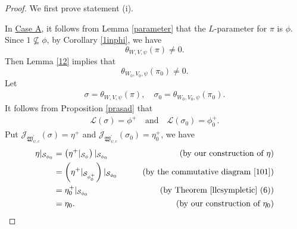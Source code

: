 \documentclass[article]{article}
\numberwithin{equation}{section}
\theoremstyle{definition}
\begin{document}
\begin{proof}
We first prove statement (i). 

In \underline{Case A}, it follows from Lemma \ref{parameter} that the $L$-parameter for $\pi$ is $\phi$. Since $\mathrm 1\not \subseteq \phi$, by Corollary \ref{1inphi}, we have $$\theta_{W,V,\psi}(\pi)\neq 0.$$ 
Then Lemma \ref{12} implies that  $$\theta_{W_0,V_0,\psi}(\pi_0)\neq 0.$$ 
Let  
\begin{align*}
\sigma=\theta_{W,V,\psi}(\pi), \quad \sigma_0=\theta_{W_0,V_0,\psi}(\pi_0). 
\end{align*}
It follows from Proposition \ref{prasad} that 
\begin{align*}
\mathcal L(\sigma)=\phi^+\quad \mbox{and}\quad \mathcal L(\sigma_0)=\phi_{0}^+. 
\end{align*}
Put $\mathcal J_{\mathfrak W^\prime_{\psi,c}}(\sigma)=\eta^+$ and $\mathcal J_{\mathfrak W^\prime_{\psi,c}}(\sigma_0)=\eta^+_0$, we have  
	\begin{align*}
	\eta|_{\mathcal S_{\phi_0}}&= \left(\eta^+|_{ \mathcal {S}_{\phi}}\right)|_{\mathcal S_{\phi_0}} & \quad \quad \mbox{(by our construction of $\eta$)} \\
	&= \left(\eta^+|_{ \mathcal S_{\phi_0^+}}\right)|_{ \mathcal S_{\phi_0}} & \quad \quad  \mbox{(by the commutative diagram \ref{101})}\\
	&=\eta_{0}^+|_{ \mathcal S_{\phi_0}} & \mbox {(by Theorem \ref{llcsympletic} (6))} \\
	&=\eta_0.  & \mbox{(by our construction of $\eta_0$)} 
	\end{align*}
	

\end{proof}
\end{document}
